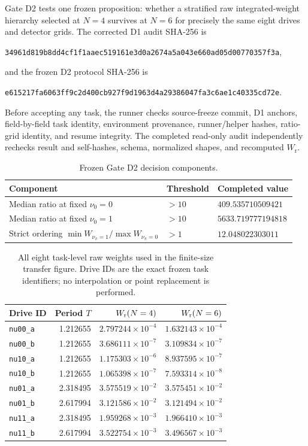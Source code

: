 \documentclass[11pt]{article}
\newcommand{\Wraw}{W_{\mathrm r}}
\begin{document}
Gate D2 tests one frozen proposition: whether a stratified raw integrated-weight hierarchy selected at $N=4$ survives at $N=6$ for precisely the same eight drives and detector grids. The corrected D1 audit SHA-256 is
\begin{center}
\texttt{34961d819b8dd4cf1f1aaec519161e3d0a2674a5a043e660ad05d00770357f3a},
\end{center}
and the frozen D2 protocol SHA-256 is
\begin{center}
\texttt{e615217fa6063ff9c2d400cb927f9d1963d4a29386047fa3c6ae1c40335cd72e}.
\end{center}
Before accepting any task, the runner checks source-freeze commit, D1 anchors, field-by-field task identity, environment provenance, runner/helper hashes, ratio-grid identity, and resume integrity. The completed read-only audit independently rechecks result and self-hashes, schema, normalized shapes, and recomputed $\Wraw$.

\begin{table}[ht]
\centering
\caption{Frozen Gate D2 decision components.}
\begin{tabular}{lll}
\toprule
Component & Threshold & Completed value \\
\midrule
Median ratio at fixed $\nu_0=0$ & $>10$ & $409.535710509421$ \\
Median ratio at fixed $\nu_0=1$ & $>10$ & $5633.719777194818$ \\
Strict ordering $\min W_{\nu_\pi=1}/\max W_{\nu_\pi=0}$ & $>1$ & $12.048022303011$ \\
\bottomrule
\end{tabular}
\end{table}

\begin{table}[ht]
\centering
\caption{All eight task-level raw weights used in the finite-size transfer figure. Drive IDs are the exact frozen task identifiers; no interpolation or point replacement is performed.}
\label{tab:supp-d2-points}
\small
\begin{tabular}{lrrr}
\toprule
Drive ID & Period $T$ & $W_{\rm r}(N=4)$ & $W_{\rm r}(N=6)$ \\
\midrule
\texttt{nu00\_a} & 1.212655 & $2.797244\times10^{-4}$ & $1.632143\times10^{-4}$ \\
\texttt{nu00\_b} & 1.212655 & $3.686111\times10^{-7}$ & $3.109834\times10^{-7}$ \\
\texttt{nu10\_a} & 1.212655 & $1.175303\times10^{-6}$ & $8.937595\times10^{-7}$ \\
\texttt{nu10\_b} & 1.212655 & $1.065398\times10^{-7}$ & $7.593314\times10^{-8}$ \\
\texttt{nu01\_a} & 2.318495 & $3.575519\times10^{-2}$ & $3.575451\times10^{-2}$ \\
\texttt{nu01\_b} & 2.617994 & $3.121586\times10^{-2}$ & $3.121494\times10^{-2}$ \\
\texttt{nu11\_a} & 2.318495 & $1.959268\times10^{-3}$ & $1.966410\times10^{-3}$ \\
\texttt{nu11\_b} & 2.617994 & $3.522754\times10^{-3}$ & $3.496567\times10^{-3}$ \\
\bottomrule
\end{tabular}
\end{table}
\end{document}
